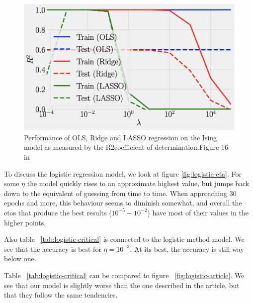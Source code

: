 \begin{figure}[H]
\includegraphics[width = 0.6\paperwidth]{figures/R2_article.png}
\caption{Performance of OLS, Ridge and LASSO regression on the Ising model as measured by the R2coefficient of determination.Figure 16 in ~\cite{HighBias}} 
\label{fig:regression-r2-article}
\end{figure}

To discuss the logistic regression model, 
we look at figure \ref{fig:logistic-eta}. For some $\eta$ the model 
quickly rises to an approximate highest value, but jumps back down to 
the equivalent of guessing from time
to time. When approaching 30 epochs and more, this behaviour 
seems to diminish somewhat, and overall the etas that produce 
the best results ($10^{-5} - 10^{-2}$) have most of their values
in the higher points.

Also table ~\ref{tab:logistic-critical} is connected 
to the logistic method model. We see that the accuracy is best
for \(\eta = 10^{-3}\). At its best, the accuracy is still 
way below one. 

Table ~\ref{tab:logistic-critical} can be compared to figure 
~\ref{fig:logistic-article}. We see that our model is slightly 
worse than the one described in the article, but that they 
follow the same tendencies. 

